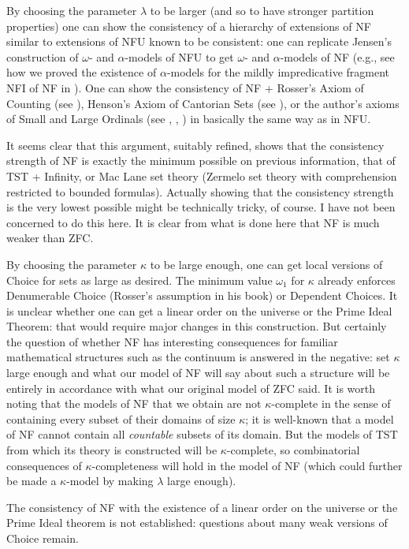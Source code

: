 \documentclass{article}
\begin{document}
By choosing the parameter $\lambda$ to be larger (and so to have stronger partition properties) one can show the consistency of a hierarchy of extensions of NF similar to extensions of NFU known to be consistent:  one can replicate Jensen's construction of $\omega$- and $\alpha$-models of NFU to get $\omega$- and $\alpha$-models of NF  (e.g.,  see how we proved the existence of $\alpha$-models for the mildly impredicative fragment NFI of NF in \cite{tangled}).
One can show the consistency of NF + Rosser's Axiom of Counting (see \cite{rosser}), Henson's Axiom of Cantorian Sets (see \cite{henson}), or the author's axioms of Small and Large Ordinals (see \cite{mybook}, \cite{strongaxioms}, \cite{nfub}) in basically the same way as in NFU.

It seems clear that this argument, suitably refined, shows that the consistency strength of NF is exactly the minimum possible on previous information, that of
TST + Infinity, or Mac Lane set theory (Zermelo set theory with comprehension restricted to bounded formulas).
Actually showing that the consistency strength is the very lowest possible might be technically tricky, of course.  I have not been concerned to do this here.  It is clear from what is done here that NF is much weaker than ZFC.

By choosing the parameter $\kappa$ to be large enough, one can get local versions of Choice for sets as large as desired.   The minimum value $\omega_1$ for $\kappa$ already enforces Denumerable Choice (Rosser's assumption in his book) or Dependent Choices.  It is unclear whether one can get a linear order on the universe or the Prime Ideal Theorem:  that would require major changes in this construction.  But certainly the question of whether NF has interesting consequences for familiar mathematical structures such as the continuum is answered in the negative:  set $\kappa$ large enough and what our model of NF will say about such a structure will be entirely in accordance with what our original model of ZFC said.
It is worth noting that the models of NF that we obtain are not $\kappa$-complete in the sense of containing every
subset of their domains of size $\kappa$; it is well-known that a model of NF cannot contain all {\em countable\/} subsets
of its domain.  But the models of TST from which its theory is constructed will be $\kappa$-complete, so combinatorial consequences of $\kappa$-completeness will hold in the model of NF (which could further be made a $\kappa$-model by making $\lambda$ large enough).

The consistency of NF with the existence of a linear order on the universe or the Prime Ideal theorem is not established:  questions about many weak versions of Choice remain.
\end{document}
